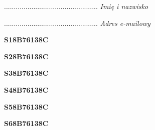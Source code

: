 \begin{turn}{90}\begin{minipage}{\linewidth} \vspace{20mm} ................................................  \textit{Imię i nazwisko}\end{minipage}\end{turn}

\begin{turn}{90}\begin{minipage}{\linewidth} \vspace{20mm} ................................................  \textit{Adres e-mailowy}\end{minipage}\end{turn}

\begin{turn}{90}\huge \begin{minipage}{\linewidth} \vspace{10mm}\textbf{S18B76138C}\end{minipage}\end{turn}

\begin{turn}{90}\huge \begin{minipage}{\linewidth} \vspace{10mm}\textbf{S28B76138C}\end{minipage}\end{turn}

\begin{turn}{90}\huge \begin{minipage}{\linewidth} \vspace{10mm}\textbf{S38B76138C}\end{minipage}\end{turn}

\begin{turn}{90}\huge \begin{minipage}{\linewidth} \vspace{10mm}\textbf{S48B76138C}\end{minipage}\end{turn}

\begin{turn}{90}\huge \begin{minipage}{\linewidth} \vspace{10mm}\textbf{S58B76138C}\end{minipage}\end{turn}

\begin{turn}{90}\huge \begin{minipage}{\linewidth} \vspace{10mm}\textbf{S68B76138C}\end{minipage}\end{turn}

